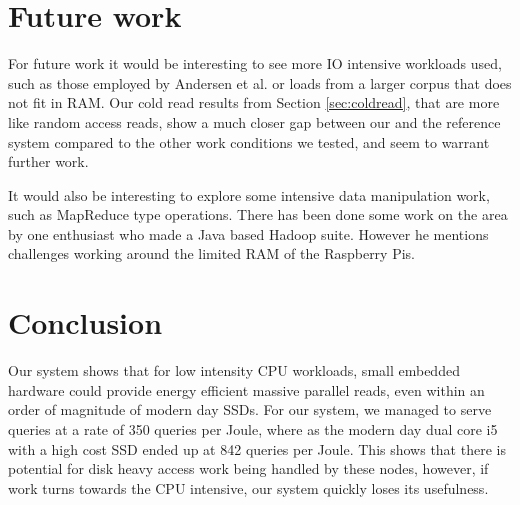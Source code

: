 
\clearpage
\section{Future work}
\label{sec:future}
For future work it would be interesting to see more IO intensive workloads used, such as those employed by Andersen et al.\cite{fawn} or loads from a larger corpus that does not fit in RAM.
Our cold read results from Section \ref{sec:coldread}, that are more like random access reads, show a much closer gap between our and the reference system compared to the other work conditions we tested, and seem to warrant further work.

It would also be interesting to explore some intensive data manipulation work, such as MapReduce type operations. There has been done some work on the area by one enthusiast who made a Java based Hadoop suite.\cite{hadoop} However he mentions challenges working around the limited RAM of the Raspberry Pis.

\clearpage
\section{Conclusion}
\label{sec:conclusion}
Our system shows that for low intensity CPU workloads, small embedded hardware could provide energy efficient massive parallel reads, even within an order of magnitude of modern day SSDs.
For our system, we managed to serve queries at a rate of 350 queries per Joule, where as the modern day dual core i5 with a high cost SSD ended up at 842 queries per Joule.
This shows that there is potential for disk heavy access work being handled by these nodes, however, if work turns towards the CPU intensive, our system quickly loses its usefulness.

